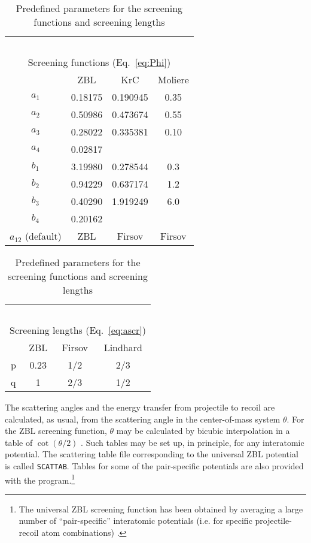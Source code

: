 \begin{table}
    \caption{Predefined parameters for the screening functions and screening 
             lengths \label{tab:screen}}
    \begin{center}
    \begin{tabular}{cccc}
        ~\\
        \multicolumn{4}{c}{Screening functions (Eq.~\ref{eq:Phi})} \\
        & ZBL \cite{I8512} & KrC \cite{I7702} & Moliere \cite{I4701} \\
        \hline
        $a_1$ & 0.18175 & 0.190945 & 0.35 \\
        $a_2$ & 0.50986 & 0.473674 & 0.55 \\
        $a_3$ & 0.28022 & 0.335381 & 0.10 \\
        $a_4$ & 0.02817 &  &  \\
        $b_1$ & 3.19980 & 0.278544 & 0.3 \\
        $b_2$ & 0.94229 & 0.637174 & 1.2 \\
        $b_3$ & 0.40290 & 1.919249 & 6.0 \\
        $b_4$ & 0.20162 &  &  \\
        $a_{12}$ (default) & ZBL & Firsov & Firsov \\
    \end{tabular}
    \hfill
    \begin{tabular}{cccc}
        ~\\
        \multicolumn{4}{c}{Screening lengths (Eq.~\ref{eq:ascr})}\\
        & ZBL \cite{I8512} & Firsov \cite{I5801} & Lindhard \cite{I6301} \\
        \hline
        p & 0.23 & 1/2 & 2/3 \\
        q & 1    & 2/3 & 1/2 \\
    \end{tabular}
    \end{center}
\end{table}

The scattering angles and the energy transfer from projectile to recoil are 
calculated, as usual, from the scattering angle in the center-of-mass system 
$\theta$. For the ZBL screening function, $\theta$ may be calculated by 
bicubic interpolation in a table of $\cot(\theta/2)$ \cite{I8730}. Such tables 
may be set up, in principle, for any interatomic potential. The scattering 
table file corresponding to the universal ZBL potential is called 
\texttt{SCATTAB}. Tables for some of the pair-specific potentials are also 
provided with the program.\footnote{%
The universal ZBL screening function has been obtained by averaging a large 
number of ``pair-specific'' interatomic potentials (i.e. for specific
projectile-recoil atom combinations) \cite{I8512}.} 

